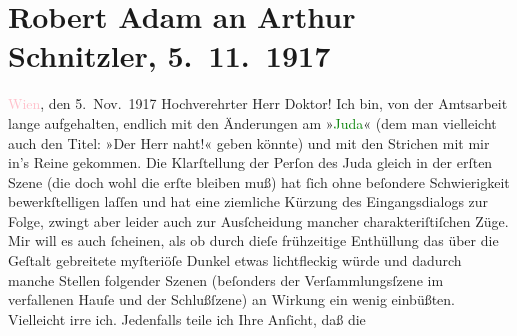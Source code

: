 

               \section[Robert Adam an Arthur Schnitzler, 5. 11. 1917]{ Robert Adam an Arthur Schnitzler, 5. 11. 1917}\nopagebreak{}\rehead{ }\normalsize\beginnumbering{} \toendnotes[C]{\smallbreak\pagebreak[2]} 
\pstart
           \raggedleft{}{\pb}\textcolor{pink}{Wien}{}\ledrightnote{\textcolor{pink}{Wien}}, den 5. Nov. 1917\pend
           \pstart\center{}Hochverehrter Herr Doktor!\pend\pstart
           Ich bin, von der Amtsarbeit lange aufgehalten, endlich mit den Änderungen am »\textcolor{green}{Juda}{}\ledrightnote{\textcolor{green}{Das Ende des Judas}}« (dem man vielleicht auch den Titel: »Der
                    Herr naht!« geben könnte) und mit den Strichen mit mir in’s Reine gekommen. Die
                    Klarſtellung der Perſon des Juda gleich in der erſten Szene (die doch wohl die
                    erſte bleiben muß) hat ſich ohne beſondere Schwierigkeit bewerkſtelligen laſſen
                    und hat eine ziemliche Kürzung des Eingangsdialogs zur Folge, zwingt aber leider
                    auch zur Ausſcheidung mancher charakteriſtiſchen Züge. Mir will es auch
                    ſcheinen,  als ob durch dieſe frühzeitige
                    Enthüllung das über die Geſtalt gebreitete myſteriöſe Dunkel etwas lichtfleckig
                    würde und  dadurch manche Stellen folgender
                    Szenen (beſonders der Verſammlungsſzene im verfallenen Hauſe und der
                    Schlußſzene) {\pb}an Wirkung ein wenig
                    einbüßten. Vielleicht irre ich. Jedenfalls teile ich Ihre Anſicht, daß die
